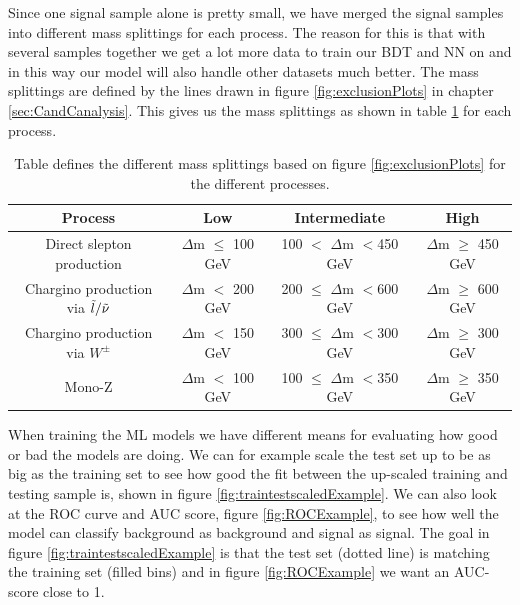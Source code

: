 Since one signal sample alone is pretty small, we have merged the signal samples into different mass splittings for each process. The reason for this is that with several samples together we get a lot more data to train our BDT and NN on and in this way our model will also handle other datasets much better. The mass splittings are defined by the lines drawn in figure \ref{fig:exclusionPlots} in chapter \ref{sec:CandCanalysis}. This gives us the mass splittings as shown in table \ref{tab:massSplittings} for each process.

\begin{table}[H]
    \centering
    \renewcommand{\arraystretch}{1.3}
    \begin{tabular}{c c c c}
    \toprule
        \textbf{Process} & \textbf{Low} & \textbf{Intermediate} & \textbf{High}\\
        \midrule
        \midrule
        Direct slepton production & $\Delta$m $\leq$ 100 GeV & 100 $<$ $\Delta$m $<$450 GeV & $\Delta$m $\geq$ 450 GeV\\
        Chargino production via $\Tilde{l}/\Tilde{\nu}$& $\Delta$m $<$ 200 GeV & 200 $\leq$ $\Delta$m $<$600 GeV & $\Delta$m $\geq$ 600 GeV\\
        Chargino production via $W^\pm$ & $\Delta$m $<$ 150 GeV & 300 $\leq$ $\Delta$m $<$300 GeV & $\Delta$m $\geq$ 300 GeV\\
        Mono-Z & $\Delta$m $<$ 100 GeV & 100 $\leq$ $\Delta$m $<$350 GeV & $\Delta$m $\geq$ 350 GeV\\
        \bottomrule
    \end{tabular}
    \caption{Table defines the different mass splittings based on figure \ref{fig:exclusionPlots} for the different processes.}
    \label{tab:massSplittings}
\end{table}


When training the ML models we have different means for evaluating how good or bad the models are doing. We can for example scale the test set up to be as big as the training set to see how good the fit between the up-scaled training and testing sample is, shown in figure \ref{fig:traintestscaledExample}. We can also look at the ROC curve and AUC score, figure \ref{fig:ROCExample}, to see how well the model can classify background as background and signal as signal. The goal in figure \ref{fig:traintestscaledExample} is that the test set (dotted line) is matching the training set (filled bins) and in figure \ref{fig:ROCExample} we want an AUC-score close to 1.

